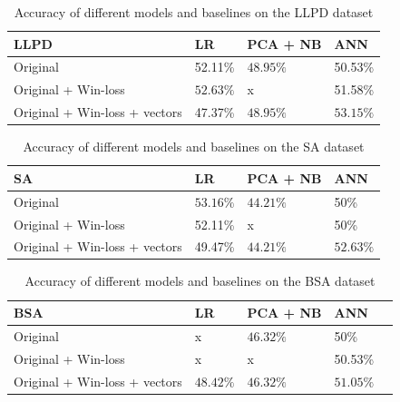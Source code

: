 \documentclass[thesis=M,english]{FITthesis}[2019/12/23]
\begin{document}
\begin{table}
\begin{center}
\begin{tabular}{|p{}| l | p{} | l |}
 \hline
 LLPD & LR & PCA + NB & ANN\\ 
 \hline
 Original & 52.11\% & $\mathbf{48.95\%}$ & 50.53\% \\  
 \hline
 Original + Win-loss & $\mathbf{52.63\%}$ & x & 51.58\% \\ 
 \hline
 Original + Win-loss + vectors & 47.37\% & $\mathbf{48.95\%}$ & $\mathbf{53.15\%}$ \\  
 \hline
\end{tabular}
\caption{Accuracy of different models and baselines on the LLPD dataset}
\label{table:llpd}
\end{center}
\end{table}

\begin{table}
\begin{center}
\begin{tabular}{|p{}| l | p{} | l |}
 \hline
 SA & LR & PCA + NB & ANN \\ 
 \hline
 Original & $\mathbf{53.16\%}$ & $\mathbf{44.21\%}$ & 50\%\\ 
 \hline
 Original + Win-loss & 52.11\% & x & 50\% \\ 
 \hline
 Original + Win-loss + vectors & 49.47\% & $\mathbf{44.21\%}$ & $\mathbf{52.63\%}$ \\  
 \hline
\end{tabular}
\caption{Accuracy of different models and baselines on the SA dataset}
\label{table:sa}
\end{center}
\end{table}

\begin{table}
\begin{center}
\begin{tabular}{|p{}| l | p{} | l | l |}
 \hline
 BSA & LR & PCA + NB & ANN \\ 
 \hline
 Original & x & $\mathbf{46.32\%}$ & 50\% \\ 
 \hline
 Original + Win-loss & x & x & 50.53\% \\ 
 \hline
 Original + Win-loss + vectors & $\mathbf{48.42\%}$ & $\mathbf{46.32\%}$ & $\mathbf{51.05\%}$ \\  
 \hline
\end{tabular}
\caption{Accuracy of different models and baselines on the BSA dataset}
\label{table:bsa}
\end{center}
\end{table}
\end{document}
